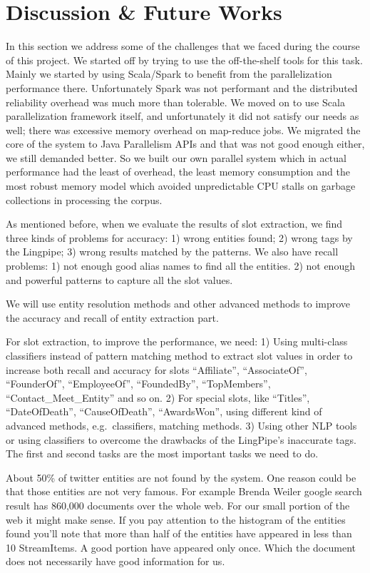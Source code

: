 

\section{Discussion \& Future Works}

In this section we address some of the challenges that we faced during the course of this project. We started 
off by trying to use the off-the-shelf tools for this task. Mainly we started 
by using Scala/Spark\cite{ferc11} to benefit from the parallelization 
performance there. Unfortunately Spark was not performant and the distributed reliability overhead 
was much more than tolerable. We moved on to use Scala parallelization  framework itself, and unfortunately it did not satisfy our needs as well; there was 
excessive memory overhead on map-reduce jobs. We migrated the core of the 
system to Java Parallelism APIs and that was not good enough either, we still demanded 
better. So we built our own parallel system which in actual performance had 
the least of overhead, the least memory consumption and the most robust memory 
model which avoided unpredictable CPU stalls on garbage collections in 
processing the corpus.

As mentioned before, when we evaluate the results of slot extraction, we find 
three kinds of problems for accuracy: 1) wrong entities found; 2) wrong tags 
by the Lingpipe; 3) wrong results matched by the patterns.  We also have 
recall problems: 1) not enough good alias names to find all the entities. 2) 
not enough and powerful patterns to capture all the slot values. 

We will use entity resolution methods and other advanced methods to improve 
the accuracy and recall of entity extraction part. 

For slot extraction, to improve the performance, we need: 1) Using multi-class classifiers instead of pattern matching method to 
extract slot values in order to increase both recall and accuracy for slots
``Affiliate'', ``AssociateOf'', ``FounderOf'', ``EmployeeOf'', ``FoundedBy'',
``TopMembers'', ``Contact\_Meet\_Entity'' and so on. 2) For special slots, 
like ``Titles'', ``DateOfDeath'', ``CauseOfDeath'', ``AwardsWon'', using different 
kind of advanced methods, e.g.\ classifiers, matching methods. 3) Using other 
NLP tools or using classifiers to overcome the drawbacks of the LingPipe’s 
inaccurate tags. The first and second tasks are the most important tasks we 
need to do.

About 50\% of twitter entities are not found by the system. One reason could be 
that those entities are not very famous. For example Brenda Weiler google 
search result has 860,000 documents over the whole web. For our 
small portion of the web it might make sense. If you pay attention to the 
histogram of the entities found you'll note that more than half of the 
entities have appeared in less than 10 StreamItems. A good portion have 
appeared only once. Which the document does not necessarily have good 
information for us.

